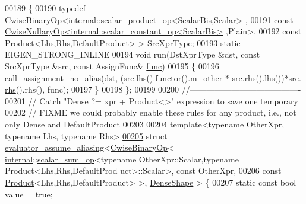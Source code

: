 \begin{DoxyCode}
00189 \{
00190   \textcolor{keyword}{typedef} \hyperlink{group___core___module_class_eigen_1_1_cwise_binary_op}{CwiseBinaryOp<internal::scalar\_product\_op<ScalarBis,Scalar>}
      ,
00191                         \textcolor{keyword}{const} 
      \hyperlink{group___core___module_class_eigen_1_1_cwise_nullary_op}{CwiseNullaryOp<internal::scalar\_constant\_op<ScalarBis>}
      ,Plain>,
00192                         \textcolor{keyword}{const} \hyperlink{group___core___module_class_eigen_1_1_product}{Product<Lhs,Rhs,DefaultProduct>} > 
      \hyperlink{group___core___module_class_eigen_1_1_cwise_binary_op}{SrcXprType};
00193   \textcolor{keyword}{static} EIGEN\_STRONG\_INLINE
00194   \textcolor{keywordtype}{void} run(DstXprType &dst, \textcolor{keyword}{const} SrcXprType &src, \textcolor{keyword}{const} AssignFunc& \hyperlink{structfunc}{func})
00195   \{
00196     call\_assignment\_no\_alias(dst, (src.\hyperlink{group___core___module_a0f73e7585dfb54d41c1983e1e6a4b269}{lhs}().functor().m\_other * src.\hyperlink{group___core___module_a3a61cbdf6d1adaa62f012045b04b6d09}{rhs}().lhs())*src.
      \hyperlink{group___core___module_a3a61cbdf6d1adaa62f012045b04b6d09}{rhs}().rhs(), func);
00197   \}
00198 \};
00199 
00200 \textcolor{comment}{//----------------------------------------}
00201 \textcolor{comment}{// Catch "Dense ?= xpr + Product<>" expression to save one temporary}
00202 \textcolor{comment}{// FIXME we could probably enable these rules for any product, i.e., not only Dense and DefaultProduct}
00203 
00204 \textcolor{keyword}{template}<\textcolor{keyword}{typename} OtherXpr, \textcolor{keyword}{typename} Lhs, \textcolor{keyword}{typename} Rhs>
\hyperlink{struct_eigen_1_1internal_1_1evaluator__assume__aliasing_3_01_cwise_binary_op_3_01internal_1_1scac641579c4e5344f96636c29532d8e354}{00205} \textcolor{keyword}{struct }\hyperlink{struct_eigen_1_1internal_1_1evaluator__assume__aliasing}{evaluator\_assume\_aliasing}<\hyperlink{group___core___module_class_eigen_1_1_cwise_binary_op}{CwiseBinaryOp}<
      \hyperlink{namespaceinternal}{internal}::\hyperlink{struct_eigen_1_1internal_1_1scalar__sum__op}{scalar\_sum\_op}<typename OtherXpr::Scalar,typename Product<Lhs,Rhs,DefaultProd
      uct>::Scalar>, const OtherXpr,
00206                                                const \hyperlink{group___core___module_class_eigen_1_1_product}{Product}<Lhs,Rhs,DefaultProduct> >, 
      \hyperlink{struct_eigen_1_1_dense_shape}{DenseShape} > \{
00207   \textcolor{keyword}{static} \textcolor{keyword}{const} \textcolor{keywordtype}{bool} value = \textcolor{keyword}{true};

\end{DoxyCode}
